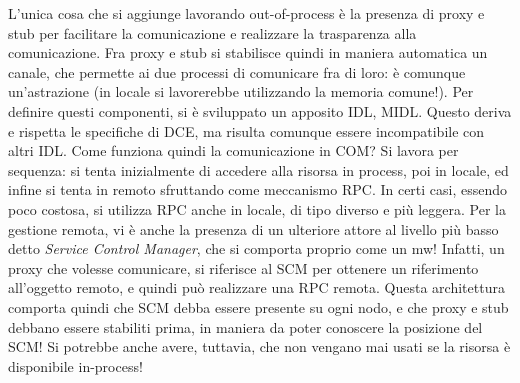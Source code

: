 L'unica cosa che si aggiunge lavorando out-of-process è la presenza di proxy e stub per facilitare la comunicazione e
realizzare la trasparenza alla comunicazione. Fra proxy e stub si stabilisce quindi in maniera automatica un canale,
che permette ai due processi di comunicare fra di loro: è comunque un'astrazione (in locale si lavorerebbe utilizzando
la memoria comune!). Per definire questi componenti, si è sviluppato un apposito IDL, MIDL. Questo deriva e rispetta
le specifiche di DCE, ma risulta comunque essere incompatibile con altri IDL.
Come funziona quindi la comunicazione in COM? Si lavora per sequenza: si tenta inizialmente di accedere alla risorsa in
process, poi in locale, ed infine si tenta in remoto sfruttando come meccanismo RPC. In certi casi, essendo poco
costosa, si utilizza RPC anche in locale, di tipo diverso e più leggera.
Per la gestione remota, vi è anche la presenza di un ulteriore attore al livello più basso detto \textit{Service
Control Manager}, che si comporta proprio come un mw!
Infatti, un proxy che volesse comunicare, si riferisce al SCM per ottenere un riferimento all'oggetto remoto, e quindi
può realizzare una RPC remota. Questa architettura comporta quindi che SCM debba essere presente su ogni nodo, e
che proxy e stub debbano essere stabiliti prima, in maniera da poter conoscere la posizione del SCM! Si potrebbe anche
avere, tuttavia, che non vengano mai usati se la risorsa è disponibile in-process!

